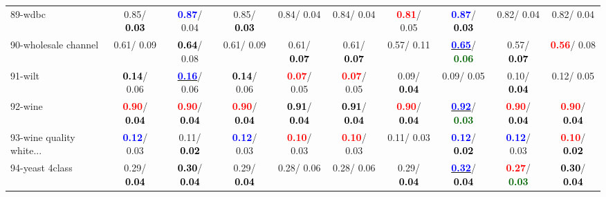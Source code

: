 \begin{table}[h]
\begin{center}
{\begin{tabular}{lc|c|c|c|c|c|c|c|c}
89-wdbc &   0.85/\textcolor{black}{\textbf{  0.03}} & \textcolor{blue}{\textbf{  0.87}}/  0.04 &   0.85/\textcolor{black}{\textbf{  0.03}} &   0.84/  0.04 &   0.84/  0.04 & \textcolor{red}{\textbf{  0.81}}/  0.05 & \textcolor{blue}{\textbf{  0.87}}/\textcolor{black}{\textbf{  0.03}} &   0.82/  0.04 &   0.82/  0.04 \\
90-wholesale channel &   0.61/  0.09 & \textcolor{black}{\textbf{  0.64}}/  0.08 &   0.61/  0.09 &   0.61/\textcolor{black}{\textbf{  0.07}} &   0.61/\textcolor{black}{\textbf{  0.07}} &   0.57/  0.11 & \underline{\textcolor{blue}{\textbf{  0.65}}}/\textcolor{darkgreen}{\textbf{  0.06}} &   0.57/\textcolor{black}{\textbf{  0.07}} & \textcolor{red}{\textbf{  0.56}}/  0.08 \\
91-wilt & \textcolor{black}{\textbf{  0.14}}/  0.06 & \underline{\textcolor{blue}{\textbf{  0.16}}}/  0.06 & \textcolor{black}{\textbf{  0.14}}/  0.06 & \textcolor{red}{\textbf{  0.07}}/  0.05 & \textcolor{red}{\textbf{  0.07}}/  0.05 &   0.09/\textcolor{black}{\textbf{  0.04}} &   0.09/  0.05 &   0.10/\textcolor{black}{\textbf{  0.04}} &   0.12/  0.05 \\
92-wine & \textcolor{red}{\textbf{  0.90}}/\textcolor{black}{\textbf{  0.04}} & \textcolor{red}{\textbf{  0.90}}/\textcolor{black}{\textbf{  0.04}} & \textcolor{red}{\textbf{  0.90}}/\textcolor{black}{\textbf{  0.04}} & \textcolor{black}{\textbf{  0.91}}/\textcolor{black}{\textbf{  0.04}} & \textcolor{black}{\textbf{  0.91}}/\textcolor{black}{\textbf{  0.04}} & \textcolor{red}{\textbf{  0.90}}/\textcolor{black}{\textbf{  0.04}} & \underline{\textcolor{blue}{\textbf{  0.92}}}/\textcolor{darkgreen}{\textbf{  0.03}} & \textcolor{red}{\textbf{  0.90}}/\textcolor{black}{\textbf{  0.04}} & \textcolor{red}{\textbf{  0.90}}/\textcolor{black}{\textbf{  0.04}} \\ \hline
93-wine quality white... & \textcolor{blue}{\textbf{  0.12}}/  0.03 &   0.11/\textcolor{black}{\textbf{  0.02}} & \textcolor{blue}{\textbf{  0.12}}/  0.03 & \textcolor{red}{\textbf{  0.10}}/  0.03 & \textcolor{red}{\textbf{  0.10}}/  0.03 &   0.11/  0.03 & \textcolor{blue}{\textbf{  0.12}}/\textcolor{black}{\textbf{  0.02}} & \textcolor{blue}{\textbf{  0.12}}/  0.03 & \textcolor{red}{\textbf{  0.10}}/\textcolor{black}{\textbf{  0.02}} \\
94-yeast 4class &   0.29/\textcolor{black}{\textbf{  0.04}} & \textcolor{black}{\textbf{  0.30}}/\textcolor{black}{\textbf{  0.04}} &   0.29/\textcolor{black}{\textbf{  0.04}} &   0.28/  0.06 &   0.28/  0.06 &   0.29/\textcolor{black}{\textbf{  0.04}} & \underline{\textcolor{blue}{\textbf{  0.32}}}/\textcolor{black}{\textbf{  0.04}} & \textcolor{red}{\textbf{  0.27}}/\textcolor{darkgreen}{\textbf{  0.03}} & \textcolor{black}{\textbf{  0.30}}/\textcolor{black}{\textbf{  0.04}} \\\end{tabular}}\label{stratsALCKappa2Allalla}
\end{center}
\end{table}
